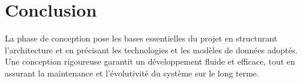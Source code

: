 \section{Conclusion}
La phase de conception pose les bases essentielles du projet en structurant
l'architecture et en précisant les technologies et les modèles de données
adoptés. Une conception rigoureuse garantit un développement fluide et
efficace, tout en assurant la maintenance et l'évolutivité du système sur le
long terme.

\clearpage
